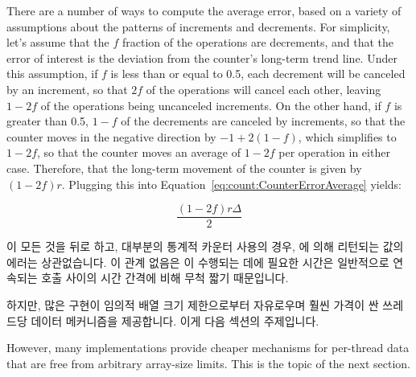 {	There are a number of ways to compute the average error,
	based on a variety of assumptions about the patterns of
	increments and decrements.
	For simplicity, let's assume that the $f$ fraction of
	the operations are decrements, and that the error of interest
	is the deviation from the counter's long-term trend line.
	Under this assumption, if $f$ is less than or equal to 0.5,
	each decrement will be canceled by an increment, so that
	$2f$ of the operations will cancel each other, leaving
	$1-2f$ of the operations being uncanceled increments.
	On the other hand, if $f$ is greater than 0.5, $1-f$ of
	the decrements are canceled by increments, so that the
	counter moves in the negative direction by $-1+2\left(1-f\right)$,
	which simplifies to $1-2f$, so that the counter moves an average
	of $1-2f$ per operation in either case.
	Therefore, that the long-term
	movement of the counter is given by $\left( 1-2f \right) r$.
	Plugging this into
	Equation~\ref{eq:count:CounterErrorAverage} yields:

	\fi

	\begin{equation}
		\frac{\left( 1 - 2 f \right) r \Delta}{2}
	\end{equation}

	이 모든 것을 뒤로 하고, 대부분의 통계적 카운터 사용의 경우,
	 에 의해 리턴되는 값의 에러는 상관없습니다.
	이 관계 없음은  이 수행되는 데에 필요한 시간은
	일반적으로 연속되는  호출 사이의 시간 간격에 비해 무척
	짧기 때문입니다.

}\QuickQuizEnd

\QuickQuizLabel{\StatisticalCounterAccuracy}

하지만, 많은 구현이 임의적 배열 크기 제한으로부터 자유로우며 훨씬 가격이 싼
쓰레드당 데이터 메커니즘을 제공합니다.
이게 다음 섹션의 주제입니다.

\iffalse

However, many implementations provide cheaper mechanisms for
per-thread data that are free from arbitrary array-size limits.
This is the topic of the next section.

